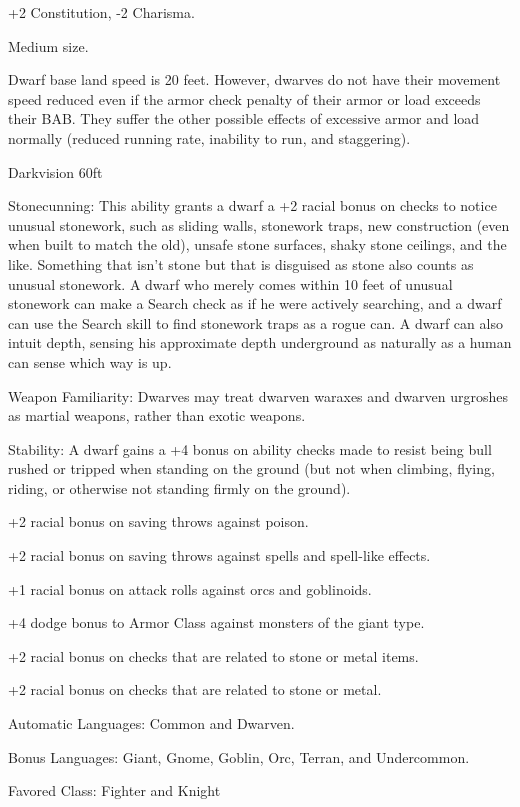 
\begin{itemize*}
\item +2 Constitution, -2 Charisma.
\item Medium size.
\item Dwarf base land speed is 20 feet. However, dwarves do not have their movement speed reduced even if the armor check penalty of their armor or load exceeds their BAB. They suffer the other possible effects of excessive armor and load normally (reduced running rate, inability to run, and staggering).
\item Darkvision 60ft
\item Stonecunning: This ability grants a dwarf a +2 racial bonus on  checks to notice unusual stonework, such as sliding walls, stonework traps, new construction (even when built to match the old), unsafe stone surfaces, shaky stone ceilings, and the like. Something that isn't stone but that is disguised as stone also counts as unusual stonework. A dwarf who merely comes within 10 feet of unusual stonework can make a Search check as if he were actively searching, and a dwarf can use the Search skill to find stonework traps as a rogue can. A dwarf can also intuit depth, sensing his approximate depth underground as naturally as a human can sense which way is up.
\item Weapon Familiarity: Dwarves may treat dwarven waraxes and dwarven urgroshes as martial weapons, rather than exotic weapons.
\item Stability: A dwarf gains a +4 bonus on ability checks made to resist being bull rushed or tripped when standing on the ground (but not when climbing, flying, riding, or otherwise not standing firmly on the ground).
\item +2 racial bonus on saving throws against poison.
\item +2 racial bonus on saving throws against spells and spell-like effects.
\item +1 racial bonus on attack rolls against orcs and goblinoids.
\item +4 dodge bonus to Armor Class against monsters of the giant type.
\item +2 racial bonus on  checks that are related to stone or metal items.
\item +2 racial bonus on  checks that are related to stone or metal.
\item Automatic Languages: Common and Dwarven.
\item Bonus Languages: Giant, Gnome, Goblin, Orc, Terran, and Undercommon.
\item Favored Class: Fighter and Knight
\end{itemize*}
